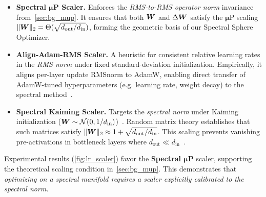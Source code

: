 \begin{itemize}[leftmargin=*]

    \item \textbf{Spectral $\boldsymbol{\mu}$P Scaler.}
    Enforces the \emph{RMS-to-RMS operator norm} invariance from~\cref{sec:bg_mup}.
    It ensures that both ${\bm{W}}$ and $\Delta{\bm{W}}$ satisfy the $\boldsymbol{\mu}$P scaling $\|{\bm{W}}\|_2=\Theta(\sqrt{d_{\mathrm{out}}/d_{\mathrm{in}}})$,
    forming the geometric basis of our Spectral Sphere Optimizer.

    \item \textbf{Align-Adam-RMS Scaler.}
    A heuristic for consistent relative learning rates in the \emph{RMS norm}
    under fixed standard-deviation initialization.
    Empirically, it aligns per-layer update RMSnorm to AdamW,
    enabling direct transfer of AdamW-tuned hyperparameters
    (e.g. learning rate, weight decay)
    to the spectral method~\citep{liu2025muonscalablellmtraining}.

    \item \textbf{Spectral Kaiming Scaler.}
    Targets the \emph{spectral norm} under Kaiming initialization
    (${\bm{W}} \sim \mathcal{N}(0, 1/d_{\mathrm{in}})$)~\citep{He2015Initialization}.
    Random matrix theory establishes that such matrices satisfy
    $\|{\bm{W}}\|_2 \approx 1 + \sqrt{d_{\mathrm{out}}/d_{\mathrm{in}}}$.
    This scaling prevents vanishing pre-activations in bottleneck layers
    where $d_{\mathrm{out}} \ll d_{\mathrm{in}}$~\citep{pethick2025trainingdeeplearningmodels}.

\end{itemize}

Experimental results (\cref{fig:lr_scaler}) favor the \textbf{Spectral $\boldsymbol{\mu}$P} scaler, supporting the theoretical scaling condition in~\cref{sec:bg_mup}. This demonstrates that \emph{optimizing on a spectral manifold requires a scaler explicitly calibrated to the spectral norm.}



